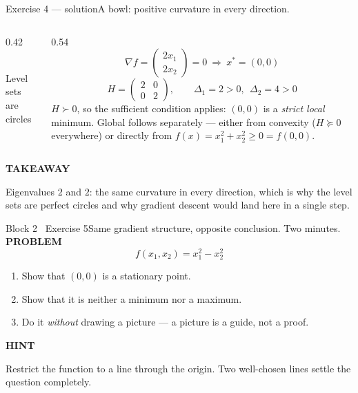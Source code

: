 \documentclass[aspectratio=169,11pt]{beamer}
\newcommand{\kicker}[1]{{\color{hseaccent}\scriptsize\bfseries\MakeUppercase{#1}}}
\newcommand{\takeaway}[2]{%
  \par\smallskip\noindent
  \colorbox{hselight}{\parbox{\dimexpr\textwidth-2\fboxsep}{%
    \kicker{#1}\par\vspace{0.12em}\footnotesize #2}}\par}
\begin{document}
\begin{frame}{Exercise 4 --- solution}{A bowl: positive curvature in every direction.}
  \vspace{0.2em}
  \begin{columns}[T,onlytextwidth]
    \begin{column}{0.42\textwidth}\centering
      \\[0.2em]
      {\scriptsize Level sets are circles}
    \end{column}
    \begin{column}{0.54\textwidth}
      \[ \nabla f=\begin{pmatrix}2x_1\\2x_2\end{pmatrix}=0\ \Rightarrow\ x^\ast=(0,0) \]
      \[ H=\begin{pmatrix}2&0\\0&2\end{pmatrix},\qquad \Delta_1=2>0,\ \ \Delta_2=4>0 \]
      {\small $H\succ0$, so the sufficient condition applies: $(0,0)$ is a \emph{strict local} minimum.
        Global follows separately --- either from convexity ($H\succeq0$ everywhere) or directly from
        $f(x)=x_1^2+x_2^2\ge0=f(0,0)$.}
    \end{column}
  \end{columns}
  \vspace{0.4em}
  \takeaway{takeaway}{Eigenvalues $2$ and $2$: the same curvature in every direction, which is why the level
    sets are perfect circles and why gradient descent would land here in a single step.}
\end{frame}

\begin{frame}{Block 2 \textperiodcentered\ Exercise 5}{Same gradient structure, opposite conclusion. Two minutes.}
  \vspace{0.6em}
  \kicker{problem}
  \[ f(x_1,x_2)=x_1^{2}-x_2^{2} \]
  \vspace{-0.5em}
  \begin{enumerate}\small
    \item Show that $(0,0)$ is a stationary point.
    \item Show that it is neither a minimum nor a maximum.
    \item Do it \emph{without} drawing a picture --- a picture is a guide, not a proof.
  \end{enumerate}
  \vspace{0.5em}
  \takeaway{hint}{Restrict the function to a line through the origin. Two well-chosen lines settle the question
    completely.}
\end{frame}
\end{document}
